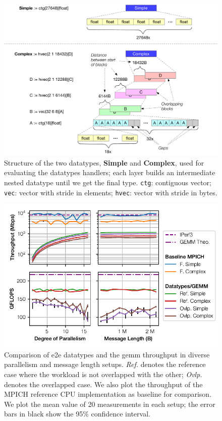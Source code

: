 \begin{figure}[tp]
    \centering
    \includegraphics[width=\textwidth]{thesis/figures/datatypes-structure.pdf}
    \caption{Structure of the two datatypes, \textbf{Simple} and \textbf{Complex}, used for evaluating the datatypes handlers; each layer builds an intermediate nested datatype until we get the final type.  \texttt{ctg}: contiguous vector; \texttt{vec}: vector with stride in elements; \texttt{hvec}: vector with stride in bytes.} \label{fig:datatypes-structure}
\end{figure}

\begin{figure}[tp]
    \centering
    \includegraphics{thesis/figures/datatypes-tput.pdf}
    \caption{Comparison of \ac{e2e} datatypes and the \ac{gemm} throughput in diverse parallelism and message length setups.  \emph{Ref.} denotes the reference case where the workload is not overlapped with the other; \emph{Ovlp.} denotes the overlapped case.  We also plot the throughput of the MPICH reference CPU implementation as baseline for comparison.  We plot the mean value of 20 measurements in each setup; the error bars in black show the 95\% confidence interval.} \label{fig:datatypes-tput}
\end{figure}

